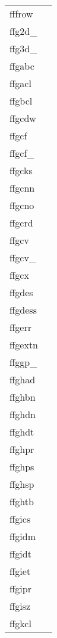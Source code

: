 \documentclass[11pt]{book}
\begin{document}
\begin{tabular}{lr}
fffrow    & \pageref{fffrow} \\
ffg2d\_      & \pageref{ffg2dx} \\
ffg3d\_      & \pageref{ffg3dx} \\
ffgabc      & \pageref{ffgabc} \\
ffgacl  & \pageref{ffgacl} \\
ffgbcl  & \pageref{ffgbcl} \\
ffgcdw  & \pageref{ffgcdw} \\
ffgcf    & \pageref{ffgcf} \\
ffgcf\_    & \pageref{ffgcfx} \\
ffgcks     & \pageref{ffgcks} \\
ffgcnn    & \pageref{ffgcnn} \\
ffgcno     & \pageref{ffgcno} \\
ffgcrd         & \pageref{ffgcrd} \\
ffgcv        & \pageref{ffgcv} \\
ffgcv\_    & \pageref{ffgcvx} \\
ffgcx     & \pageref{ffgcx} \\
ffgdes & \pageref{ffgdes} \\
ffgdess & \pageref{ffgdes} \\
ffgerr  & \pageref{ffgerr} \\
ffgextn        & \pageref{ffgextn} \\
ffggp\_  & \pageref{ffggpx} \\
ffghad    & \pageref{ffghad} \\
ffghbn      & \pageref{ffghbn} \\
ffghdn    & \pageref{ffghdn} \\
ffghdt   & \pageref{ffghdt} \\
ffghpr       & \pageref{ffghpr} \\
ffghps        & \pageref{ffghps} \\
ffghsp      & \pageref{ffghsp} \\
ffghtb      & \pageref{ffghtb} \\
ffgics & \pageref{ffgics} \\
ffgidm & \pageref{ffgidm} \\
ffgidt & \pageref{ffgidt} \\
ffgiet & \pageref{ffgidt} \\
ffgipr & \pageref{ffgipr} \\
ffgisz & \pageref{ffgisz} \\
ffgkcl      & \pageref{ffgkcl} \\

\end{tabular}
\end{document}
